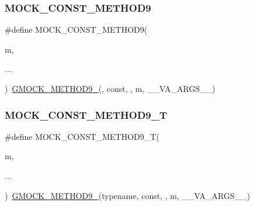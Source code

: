 \mbox{\label{_obj__test_2lib_2googletest-release-1_88_81_2googlemock_2include_2gmock_2gmock-generated-function-mockers_8h_ab7429646bacf56a7d560a3d81d497880}} 
\subsubsection{\texorpdfstring{MOCK\_CONST\_METHOD9}{MOCK\_CONST\_METHOD9}}
{\footnotesize\ttfamily \#define M\+O\+C\+K\+\_\+\+C\+O\+N\+S\+T\+\_\+\+M\+E\+T\+H\+O\+D9(\begin{DoxyParamCaption}\item[{}]{m,  }\item[{}]{... }\end{DoxyParamCaption})~\mbox{\hyperlink{_obj__test_2lib_2googletest-release-1_88_81_2googlemock_2include_2gmock_2gmock-generated-function-mockers_8h_aa820171a19cc587c247dbe05cbffc55f}{G\+M\+O\+C\+K\+\_\+\+M\+E\+T\+H\+O\+D9\+\_\+}}(, const, , m, \+\_\+\+\_\+\+V\+A\+\_\+\+A\+R\+G\+S\+\_\+\+\_\+)}

\mbox{\label{_obj__test_2lib_2googletest-release-1_88_81_2googlemock_2include_2gmock_2gmock-generated-function-mockers_8h_a7875d0d77516825a4b9cee703ae85c6f}} 
\subsubsection{\texorpdfstring{MOCK\_CONST\_METHOD9\_T}{MOCK\_CONST\_METHOD9\_T}}
{\footnotesize\ttfamily \#define M\+O\+C\+K\+\_\+\+C\+O\+N\+S\+T\+\_\+\+M\+E\+T\+H\+O\+D9\+\_\+T(\begin{DoxyParamCaption}\item[{}]{m,  }\item[{}]{... }\end{DoxyParamCaption})~\mbox{\hyperlink{_obj__test_2lib_2googletest-release-1_88_81_2googlemock_2include_2gmock_2gmock-generated-function-mockers_8h_aa820171a19cc587c247dbe05cbffc55f}{G\+M\+O\+C\+K\+\_\+\+M\+E\+T\+H\+O\+D9\+\_\+}}(typename, const, , m, \+\_\+\+\_\+\+V\+A\+\_\+\+A\+R\+G\+S\+\_\+\+\_\+)}


